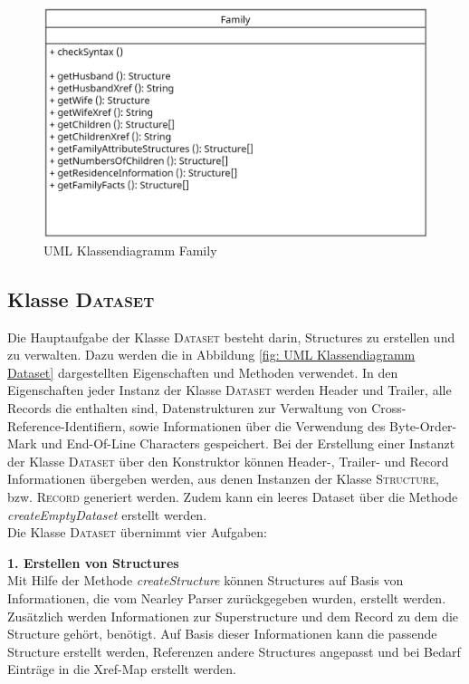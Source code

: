 \label{subsec: Implementierung - Gedcom Struktur - Klasse Family}
\begin{figure}[h]
	\centering
	\includegraphics[width=1\textwidth]{images/UML_Class_Family.png}
	\caption{UML Klassendiagramm Family}
	\label{fig: UML Klassendiagramm Family}
\end{figure}

\subsection{Klasse \textsc{Dataset}}
\label{subsec: Implementierung - Gedcom Struktur - Klasse Dataset}
Die Hauptaufgabe der Klasse \textsc{Dataset} besteht darin, Structures zu erstellen und zu verwalten. Dazu werden die in Abbildung \ref{fig: UML Klassendiagramm Dataset} dargestellten Eigenschaften und Methoden verwendet. In den Eigenschaften jeder Instanz der Klasse \textsc{Dataset} werden Header und Trailer, alle Records die enthalten sind, Datenstrukturen zur Verwaltung von Cross-Reference-Identifiern, sowie Informationen über die Verwendung des Byte-Order-Mark und End-Of-Line Characters gespeichert. Bei der Erstellung einer Instanzt der Klasse \textsc{Dataset} über den Konstruktor können Header-, Trailer- und Record Informationen übergeben werden, aus denen Instanzen der Klasse \textsc{Structure}, bzw. \textsc{Record} generiert werden. Zudem kann ein leeres Dataset über die Methode \textit{createEmptyDataset} erstellt werden.\\
Die Klasse \textsc{Dataset} übernimmt vier Aufgaben: 

\vspace{1em}
\textbf{1. Erstellen von Structures} \vspace{0.5em} \\
Mit Hilfe der Methode \textit{createStructure} können Structures auf Basis von Informationen, die vom Nearley Parser zurückgegeben wurden, erstellt werden. Zusätzlich werden Informationen zur Superstructure und dem Record zu dem die Structure gehört, benötigt. Auf Basis dieser Informationen kann die passende Structure erstellt werden, Referenzen andere Structures angepasst und bei Bedarf Einträge in die Xref-Map erstellt werden. 

